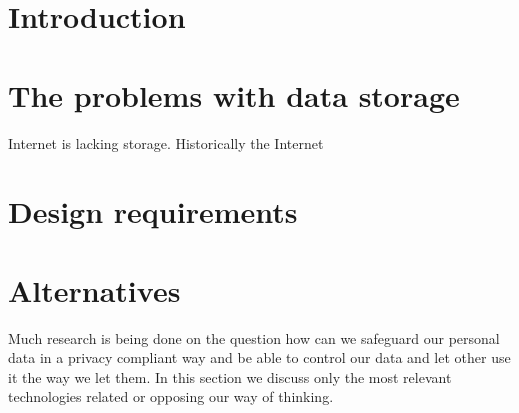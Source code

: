 \documentclass{article}
\begin{document}
\tableofcontents

%  
%  
%  

\section{Introduction}

\section{The problems with data storage}
Internet is lacking storage. Historically the Internet 


\section{Design requirements}
\section{Alternatives}
%
Much research is being done on the question how can we safeguard our personal data in a privacy compliant way and be able to control our data and let other use it the way we let them. In this section we discuss only the most relevant technologies related or opposing our way of thinking.
\end{document}
